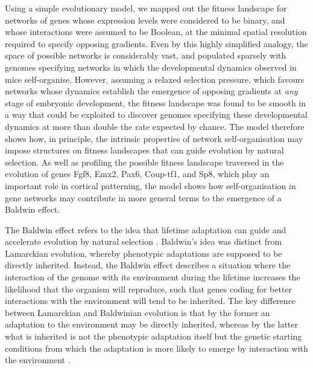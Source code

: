 \documentclass[10pt,letterpaper]{article}
\begin{document}



Using a simple evolutionary model, we mapped out the fitness landscape for networks of genes whose expression levels were considered to be binary, and whose interactions were assumed to be Boolean, at the minimal spatial resolution required to specify opposing gradients. Even by this highly simplified analogy, the space of possible networks is considerably vast, and populated sparsely with genomes specifying networks in which the developmental dynamics observed in mice self-organise. However, assuming a relaxed selection pressure, which favours networks whose dynamics establish the emergence of opposing gradients at \emph{any} stage of embryonic development, the fitness landscape was found to be smooth in a way that could be exploited to discover genomes specifying these developmental dynamics at more than double the rate expected by chance. The model therefore shows how, in principle, the intrinsic properties of network self-organisation may impose structures on fitness landscapes that can guide evolution by natural selection. As well as profiling the possible fitness landscape traversed in the evolution of genes Fgf8, Emx2, Pax6, Coup-tf1, and Sp8, which play an important role in cortical patterning, the model shows how self-organisation in gene networks may contribute in more general terms to the emergence of a Baldwin effect.


The Baldwin effect refers to the idea that lifetime adaptation can guide and accelerate evolution by natural selection \cite{Baldwin1896}. Baldwin's idea was distinct from Lamarckian evolution, whereby phenotypic adaptations are supposed to be directly inherited. Instead, the Baldwin effect describes a situation where the interaction of the genome with its environment during the lifetime increases the likelihood that the organism will reproduce, such that genes coding for better interactions with the environment will tend to be inherited. The key difference between Lamarckian and Baldwinian evolution is that by the former an adaptation to the environment may be directly inherited, whereas by the latter what is inherited is not the phenotypic adaptation itself but the genetic starting conditions from which the adaptation is more likely to emerge by interaction with the environment \cite{Weber2003}.
\end{document}
